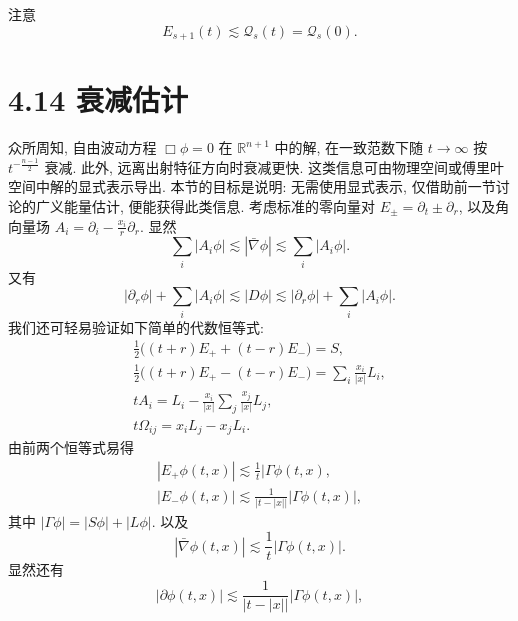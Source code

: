 \setcounter{mtthm}{12}%

\begin{remark}\label{rem:4.13}
注意
\begin{equation}
E_{s+1}(t)\lesssim\mathcal{Q}_s(t)=\mathcal{Q}_s(0).\end{equation}
\end{remark}

\setcounter{mtthm}{14}%

\section*{4.14 衰减估计}

众所周知, 自由波动方程 $\Box\phi=0$ 在 $\mathbb{R}^{n+1}$ 中的解, 在一致范数下随 $t\to\infty$ 按 $t^{-\frac{n-1}{2}}$ 衰减. 此外, 远离出射特征方向时衰减更快. 这类信息可由物理空间或傅里叶空间中解的显式表示导出. 本节的目标是说明: 无需使用显式表示, 仅借助前一节讨论的广义能量估计, 便能获得此类信息.
考虑标准的零向量对 $E_\pm=\partial_t\pm\partial_r$, 以及角向量场 $A_i=\partial_i-\frac{x_i}{r}\partial_r$. 显然
\begin{equation}
\sum_i|A_i\phi|\lesssim|\bar\nabla\phi|\lesssim\sum_i|A_i\phi|.\end{equation}
又有
\begin{equation}
|\partial_r\phi|+\sum_i|A_i\phi|\lesssim|D\phi|\lesssim|\partial_r\phi|+\sum_i|A_i\phi|.\end{equation}
我们还可轻易验证如下简单的代数恒等式:
\begin{gather}
\frac12\bigl((t+r)E_+ +(t-r)E_-\bigr)=S,\\
\frac12\bigl((t+r)E_+ -(t-r)E_-\bigr)=\sum_i\frac{x_i}{|x|}L_i,\\
tA_i=L_i-\frac{x_i}{|x|}\sum_j\frac{x_j}{|x|}L_j,\\
t\Omega_{ij}=x_iL_j-x_jL_i.\end{gather}
由前两个恒等式易得
\begin{gather}
|E_+\phi(t,x)|\lesssim\frac1t|\Gamma\phi(t,x),\\
|E_-\phi(t,x)|\lesssim\frac1{|t-|x||}|\Gamma\phi(t,x)|,\end{gather}
其中 $|\Gamma\phi|=|S\phi|+|L\phi|$. 以及
\begin{equation}
|\bar\nabla\phi(t,x)|\lesssim\frac1t|\Gamma\phi(t,x)|.\end{equation}
显然还有
\begin{equation}
|\partial\phi(t,x)|\lesssim\frac1{|t-|x||}|\Gamma\phi(t,x)|,\end{equation}
